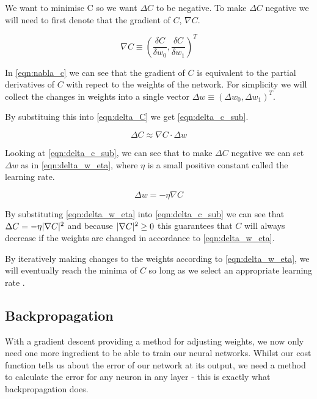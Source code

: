 We want to minimise C so we want $\Delta C$ to be negative. To make $\Delta C$ negative we will need to first denote that the gradient of $C$, $\nabla C$. 

\begin{equation} \label{eqn:nabla_c}
\nabla C \equiv (\frac{\delta C}{\delta w_0}, \frac{\delta C}{\delta w_1})^T
\end{equation}

In \autoref{eqn:nabla_c} we can see that the gradient of $C$ is equivalent to the partial derivatives of $C$ with repect to the weights of the network. For simplicity we will collect the changes in weights into a single vector $\Delta w \equiv (\Delta w_0, \Delta w_1)^T$.

By substituing this into \autoref{eqn:delta_C} we get \autoref{eqn:delta_c_sub}.

\begin{equation} \label{eqn:delta_c_sub}
\Delta C \approx \nabla C \cdot \Delta w 
\end{equation}

Looking at \autoref{eqn:delta_c_sub}, we can see that to make $\Delta C$ negative we can set $\Delta w$ as in \autoref{eqn:delta_w_eta}, where $\eta$ is a small positive constant called the learning rate.

\begin{equation} \label{eqn:delta_w_eta}
\Delta w = -\eta \nabla C
\end{equation}

By substituting \autoref{eqn:delta_w_eta} into \autoref{eqn:delta_c_sub} we can see that $ \Delta C = - \eta \lvert\nabla C\rvert^2$ and because $\lvert\nabla C\rvert^2 \geq 0$ this guarantees that $C$ will always decrease if the weights are changed in accordance to \autoref{eqn:delta_w_eta}.

By iteratively making changes to the weights according to \autoref{eqn:delta_w_eta}, we will eventually reach the minima of $C$ so long as we select an appropriate learning rate . 

\subsection{Backpropagation}
With a gradient descent providing a method for adjusting  weights, we now only need one more ingredient to be able to train our neural networks. Whilst our cost function tells us about the error of our network at its output, we need a method to calculate the error for any neuron in any layer - this is exactly what backpropagation does. 

